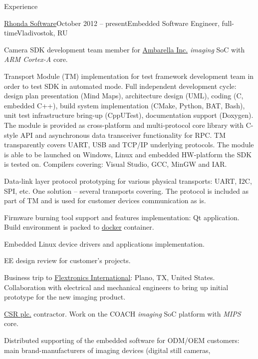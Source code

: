 \documentclass{template}
\begin{document}
\begin{rSection}{Experience}
\begin{rCompany}{\href{http://www.rhondasoftware.com}{Rhonda Software}}{October 2012 -- present}{Embedded Software Engineer, full-time}{Vladivostok, RU}

\item Camera SDK development team member for \href{http://www.ambarella.com}{Ambarella Inc.} \textit{imaging} SoC with \textit{ARM Cortex-A} core.
\item Transport Module (TM) implementation for test framework development team in order to test SDK in automated mode. Full independent development
      cycle: design plan presentation (Mind Maps), architecture design (UML), coding (C, embedded C++), build system implementation (CMake, Python,
      BAT, Bash), unit test infrastructure bring-up (CppUTest), documentation support (Doxygen). The module is provided as cross-platform and
      multi-protocol core library with C-style API and asynchronous data transceiver functionality for RPC. TM transparently covers UART, USB and
      TCP/IP underlying protocols. The module is able to be launched on Windows, Linux and embedded HW-platform the SDK is tested on. Compilers
      covering: Visual Studio, GCC, MinGW and IAR.
\item Data-link layer protocol prototyping for various physical transports: UART, I2C, SPI, etc. One solution -- several transports covering.
      The protocol is included as part of TM and is used for customer devices communication as is.
\item Firmware burning tool support and features implementation: Qt application. Build environment is packed to \href{www.docker.com}{docker}
      container.
\item Embedded Linux device drivers and applications implementation.
\item EE design review for customer's projects.
\item Business trip to \href{http://www.flextronics.com}{Flextronics International}: Plano, TX, United States. Collaboration with electrical and
      mechanical engineers to bring up initial prototype for the new imaging product. \newline
\item \href{http://www.csr.com}{CSR plc.} contractor. Work on the COACH \textit{imaging} SoC platform with \textit{MIPS} core.
\item Distributed supporting of the embedded software for ODM/OEM customers: main brand-manufacturers of imaging devices (digital still cameras,

\end{rCompany}
\end{rSection}
\end{document}
